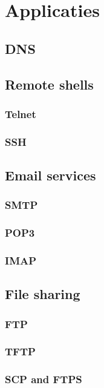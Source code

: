 \chapter{Applicaties}



\section{DNS}


\section{Remote shells}
\subsection{Telnet}
\subsection{SSH}


\section{Email services}

\subsection{SMTP}
\subsection{POP3}
\subsection{IMAP}

\section{File sharing}

\subsection{FTP}
\subsection{TFTP}
\subsection{SCP and FTPS}

